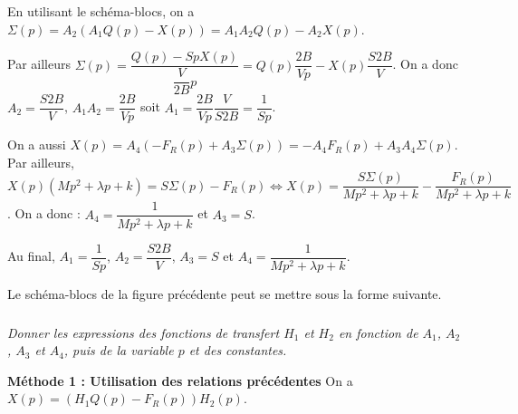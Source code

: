 \begin{multicols}{2}
\begin{corrige}
En utilisant le schéma-blocs, on a $\Sigma(p)=A_2\left(A_1Q(p)-X(p)\right) = A_1A_2Q(p)-A_2X(p)$.

Par ailleurs $\Sigma(p)=\dfrac{Q(p)-S p X(p)}{\dfrac{V}{2B} p}= Q(p)\dfrac{2B}{Vp}-  X(p)  \dfrac{S2B}{V} $. On a donc $A_2 = \dfrac{S2B}{V} $, $A_1 A_2 = \dfrac{2B}{Vp}$ soit $A_1  = \dfrac{2B}{Vp}\dfrac{V}{S2B}= \dfrac{1}{Sp}$. 


On a aussi $X(p)=A_4\left(-F_R(p)+A_3\Sigma(p)\right) =-A_4F_R(p)+A_3A_4\Sigma(p)$. Par ailleurs,
$X(p) \left(Mp^2  +\lambda p  + k\right)= S \Sigma(p) - F_R(p) \Leftrightarrow X(p) =  \dfrac{S \Sigma(p)}{Mp^2  +\lambda p  + k}-\dfrac{F_R(p)}{Mp^2  +\lambda p  + k}$. On a donc : $A_4 = \dfrac{1}{Mp^2  +\lambda p  + k}$ et $A_3 = S$.

Au final,  $A_1=\dfrac{1}{Sp}$,  $A_2 = \dfrac{S2B}{V} $,  $A_3 = S$  et $A_4 = \dfrac{1}{Mp^2  +\lambda p  + k}$.
\end{corrige}
\else
\fi

\ifprof
\else

Le schéma-blocs de la figure précédente peut se mettre sous la forme suivante. 

\footnotesize
\begin{center}
\end{center}
\normalsize

\fi

\subparagraph{}\textit{Donner les expressions des fonctions de transfert $H_1$
et $H_2$ en fonction de $A_1$, $A_2$, $A_3$ et $A_4$, puis de la variable $p$ et
des constantes.}
\ifprof
\begin{corrige}
\textbf{Méthode 1 : Utilisation des relations précédentes}
On a $X(p)=\left(H_1Q(p)-F_R(p)\right)H_2(p)$. 


\end{corrige}
\end{multicols}
